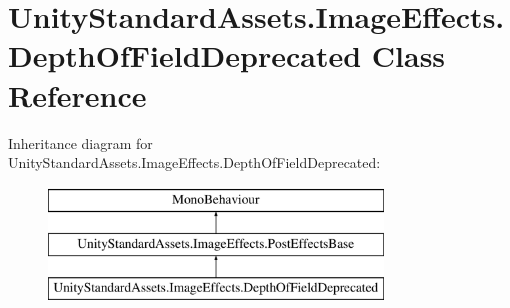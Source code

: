 \hypertarget{class_unity_standard_assets_1_1_image_effects_1_1_depth_of_field_deprecated}{}\section{Unity\+Standard\+Assets.\+Image\+Effects.\+Depth\+Of\+Field\+Deprecated Class Reference}
\label{class_unity_standard_assets_1_1_image_effects_1_1_depth_of_field_deprecated}
Inheritance diagram for Unity\+Standard\+Assets.\+Image\+Effects.\+Depth\+Of\+Field\+Deprecated\+:\begin{figure}[H]
\begin{center}
\leavevmode
\includegraphics[height=3.000000cm]{class_unity_standard_assets_1_1_image_effects_1_1_depth_of_field_deprecated}
\end{center}
\end{figure}
